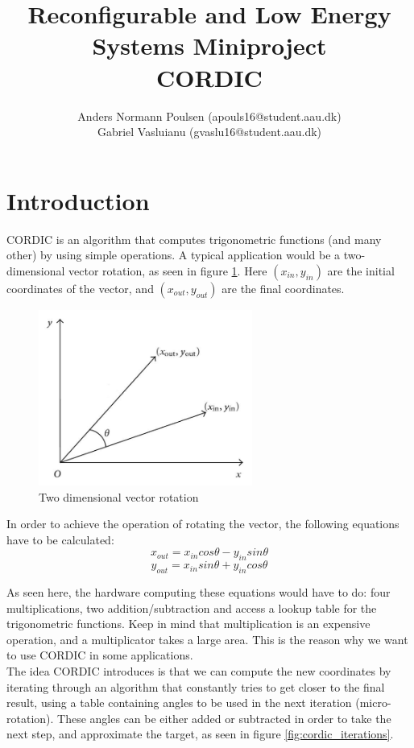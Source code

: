 \documentclass[12pt, a4paper,oneside]{article}
\title{Reconfigurable and Low Energy Systems Miniproject\\\large CORDIC}
\author{Anders Normann Poulsen (apouls16@student.aau.dk)\\Gabriel Vasluianu (gvaslu16@student.aau.dk)}
\begin{document}
\maketitle
\newpage
\section{Introduction}
CORDIC is an algorithm that computes trigonometric functions (and many other)
by using simple operations.
A typical application would be a two-dimensional vector rotation, as seen in 
figure \ref{fig:two_vector}. Here $(x_{in}, y_{in})$ are the initial coordinates
of the vector, and $(x_{out}, y_{out})$ are the final coordinates.

\begin{figure}[h]
	\centering
	\includegraphics[width = 7cm]{two_vector.jpg}
	\caption{Two dimensional vector rotation}
	\label{fig:two_vector}
\end{figure}

In order to achieve the operation of rotating the vector, the following equations
have to be calculated:
\[ x_{out} = x_{in} cos\theta - y_{in} sin\theta \]
\[ y_{out} = x_{in} sin\theta + y_{in} cos\theta \]

As seen here, the hardware computing these equations would have to do:
four multiplications, two addition/subtraction 
and access a lookup table for the trigonometric functions\cite{cordic1}.
Keep in mind that multiplication is an expensive operation, and a multiplicator
takes a large area. This is the reason why we want to use CORDIC in some 
applications.
\\

The idea CORDIC introduces is that we can compute the new coordinates by 
iterating through an algorithm that constantly tries to get closer to the 
final result, using a table containing angles to be used in the next iteration
(micro-rotation). These angles can be either added or subtracted in order
to take the next step, and approximate the target, as seen in figure \ref{fig:cordic_iterations}.
\end{document}

